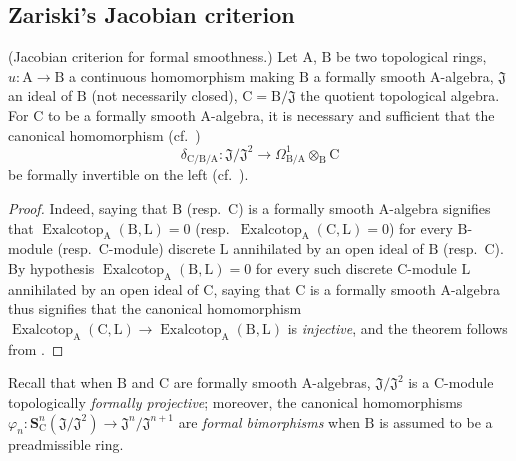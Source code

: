 \subsection{Zariski's Jacobian criterion}
\label{subsection:0.22.6}

\begin{theorem}[22.6.1]
\label{0.22.6.1}
\textnormal{(Jacobian criterion for formal smoothness.)}
Let $\mathrm{A}$, $\mathrm{B}$ be two topological rings, $u:\mathrm{A}\to\mathrm{B}$ a continuous homomorphism making $\mathrm{B}$ a \textup{formally smooth} $\mathrm{A}$-algebra, $\mathfrak{J}$ an ideal of $\mathrm{B}$ (not necessarily closed), $\mathrm{C}=\mathrm{B}/\mathfrak{J}$ the quotient topological algebra.
For $\mathrm{C}$ to be a formally smooth $\mathrm{A}$-algebra, it is necessary and sufficient that the canonical homomorphism (cf.~)
\[
\label{0.22.6.1.1}
  \delta_{\mathrm{C}/\mathrm{B}/\mathrm{A}}:\mathfrak{J}/\mathfrak{J}^2\to\Omega^1_{\mathrm{B}/\mathrm{A}}\otimes_\mathrm{B}\mathrm{C}
  \tag{22.6.1.1}
\]
be formally invertible on the left (cf.~).
\end{theorem}

\begin{proof}
Indeed, saying that $\mathrm{B}$ (resp.~$\mathrm{C}$) is a formally smooth $\mathrm{A}$-algebra signifies  that $\operatorname{Exalcotop}_\mathrm{A}(\mathrm{B},\mathrm{L})=0$ (resp.~$\operatorname{Exalcotop}_\mathrm{A}(\mathrm{C},\mathrm{L})=0$) for every $\mathrm{B}$-module (resp.~$\mathrm{C}$-module) discrete $\mathrm{L}$ annihilated by an open ideal of $\mathrm{B}$ (resp.~$\mathrm{C}$).
By hypothesis $\operatorname{Exalcotop}_\mathrm{A}(\mathrm{B},\mathrm{L})=0$ for every such discrete $\mathrm{C}$-module $\mathrm{L}$ annihilated by an open ideal of $\mathrm{C}$, saying that $\mathrm{C}$ is a formally smooth $\mathrm{A}$-algebra thus signifies that the canonical homomorphism $\operatorname{Exalcotop}_\mathrm{A}(\mathrm{C},\mathrm{L})\to\operatorname{Exalcotop}_\mathrm{A}(\mathrm{B},\mathrm{L})$ is \emph{injective}, and the theorem follows from .
\end{proof}

Recall  that when $\mathrm{B}$ and $\mathrm{C}$ are formally smooth $\mathrm{A}$-algebras, $\mathfrak{J}/\mathfrak{J}^2$ is a $\mathrm{C}$-module topologically \emph{formally projective}; moreover, the canonical homomorphisms $\varphi_n:\mathbf{S}^n_\mathrm{C}(\mathfrak{J}/\mathfrak{J}^2)\to\mathfrak{J}^n/\mathfrak{J}^{n+1}$ are \emph{formal bimorphisms} when $\mathrm{B}$ is assumed to be a preadmissible ring.

